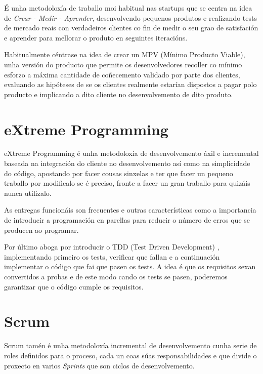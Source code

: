   É unha metodoloxía de traballo moi habitual nas startups que se centra na 
idea de \emph{Crear - Medir - Aprender}, desenvolvendo pequenos produtos e 
realizando tests de mercado reais con verdadeiros clientes co fin de medir o 
seu grao de satisfación e aprender para mellorar o produto en seguintes 
iteracións.
  
  Habitualmente céntrase na idea de crear un MPV (Mínimo Producto Viable), unha 
versión do producto que permite os desenvolvedores recoller co mínimo esforzo a 
máxima cantidade de coñecemento validado por parte dos clientes, evaluando as 
hipóteses de se os clientes realmente estarían dispostos a pagar polo 
producto e implicando a dito cliente no desenvolvemento de dito produto.
  
  \section{eXtreme Programming}
  eXtreme Programming é unha metodoloxia de desenvolvemento áxil e incremental 
baseada na integración do cliente no desenvolvemento así como na simplicidade 
do código, apostando por facer cousas sinxelas e ter que facer un pequeno 
traballo por modificalo se é preciso, fronte a facer un gran traballo para 
quizáis nunca utilizalo.

  As entregas funcionáis son frecuentes e outras características como a 
importancia de introducir a programación en parellas para reducir o número de 
erros que se producen ao programar.

  Por último aboga por introducir o TDD (Test Driven Development) , 
implementando primeiro os tests, verificar que fallan e a continuación 
implementar o código que fai que pasen os tests.
  A idea é que os requisitos sexan convertidos a probas e de este modo cando os 
tests se pasen, poderemos garantizar que o código cumple os requisitos.

  \section{Scrum}
  Scrum tamén é unha metodoloxía incremental de desenvolvemento cunha serie de 
roles definidos para o proceso, cada un coas súas responsabilidades e que divide 
o proxecto en varios \emph{Sprints} que son ciclos de desenvolvemento.

